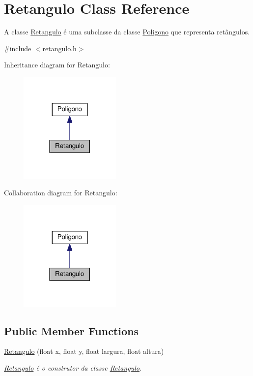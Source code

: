 \hypertarget{class_retangulo}{}\section{Retangulo Class Reference}
\label{class_retangulo}


A classe \hyperlink{class_retangulo}{Retangulo} é uma subclasse da classe \hyperlink{class_poligono}{Poligono} que representa retângulos.  




{\ttfamily \#include $<$retangulo.\+h$>$}



Inheritance diagram for Retangulo\+:\nopagebreak
\begin{figure}[H]
\begin{center}
\leavevmode
\includegraphics[width=141pt]{class_retangulo__inherit__graph}
\end{center}
\end{figure}


Collaboration diagram for Retangulo\+:\nopagebreak
\begin{figure}[H]
\begin{center}
\leavevmode
\includegraphics[width=141pt]{class_retangulo__coll__graph}
\end{center}
\end{figure}
\subsection*{Public Member Functions}
\begin{DoxyCompactItemize}
\item 
\hyperlink{class_retangulo_acca1dd211eefc8dc04658c943c0d1122}{Retangulo} (float x, float y, float largura, float altura)
\begin{DoxyCompactList}\small\item\em \hyperlink{class_retangulo}{Retangulo} é o construtor da classe \hyperlink{class_retangulo}{Retangulo}. \end{DoxyCompactList}\end{DoxyCompactItemize}



